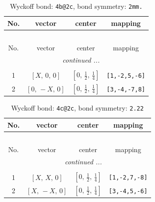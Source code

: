 \documentclass[fleqn,8pt]{jsarticle}
\begin{document}
\renewcommand{\arraystretch}{1.2}
\begin{longtable}{cccc}
\caption{Wyckoff bond: {\tt 4b@2c}, bond symmetry: {\tt 2mm.}}
 \\
 \hline \hline
No. & vector & center & mapping \\ \hline \endfirsthead

\multicolumn{3}{l}{\tablename\ \thetable{}} \\
 \hline \hline
No. & vector & center & mapping \\ \hline \endhead

 \hline \hline
\multicolumn{3}{r}{\footnotesize\it continued ...} \\ \endfoot

 \hline \hline
\multicolumn{3}{r}{} \\ \endlastfoot

1 & $\left[ X,\, 0,\, 0 \right]$ & $\left[ 0,\, \frac{1}{2},\, \frac{1}{4} \right]$ & {\tt [1,-2,5,-6]} \\ \hline
2 & $\left[ 0,\, - X,\, 0 \right]$ & $\left[ 0,\, \frac{1}{2},\, \frac{1}{4} \right]$ & {\tt [3,-4,-7,8]} \\
\end{longtable}
\renewcommand{\arraystretch}{1.2}
\begin{longtable}{cccc}
\caption{Wyckoff bond: {\tt 4c@2c}, bond symmetry: {\tt 2.22}}
 \\
 \hline \hline
No. & vector & center & mapping \\ \hline \endfirsthead

\multicolumn{3}{l}{\tablename\ \thetable{}} \\
 \hline \hline
No. & vector & center & mapping \\ \hline \endhead

 \hline \hline
\multicolumn{3}{r}{\footnotesize\it continued ...} \\ \endfoot

 \hline \hline
\multicolumn{3}{r}{} \\ \endlastfoot

1 & $\left[ X,\, X,\, 0 \right]$ & $\left[ 0,\, \frac{1}{2},\, \frac{1}{4} \right]$ & {\tt [1,-2,7,-8]} \\ \hline
2 & $\left[ X,\, - X,\, 0 \right]$ & $\left[ 0,\, \frac{1}{2},\, \frac{1}{4} \right]$ & {\tt [3,-4,5,-6]} \\
\end{longtable}
\renewcommand{\arraystretch}{1.2}
\end{document}
